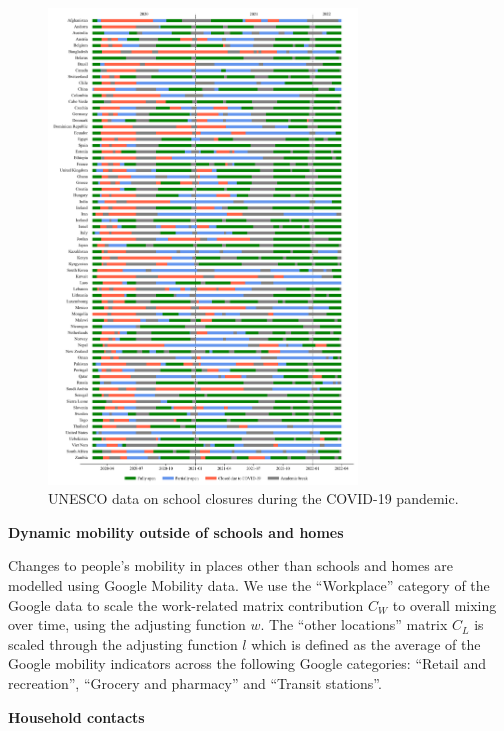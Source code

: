 \begin{figure}[p]
  \begin{center}
  \includegraphics[width=0.73\textwidth]{../../tex_descriptions/projects/sm_covid/school_closures/unesco.png}
  \end{center}
  \caption{UNESCO data on school closures during the COVID-19 pandemic.
  } 
  \label{fig:unesco}
\end{figure}

\vspace{5pt}
\textbf{Dynamic mobility outside of schools and homes}

Changes to people's mobility in places other than schools and homes are modelled using Google Mobility data. We use the ``Workplace''
category of the Google data to scale the work-related matrix contribution $C_W$ to overall mixing over time, using the adjusting function
$w$. The ``other locations'' matrix $C_L$ is scaled through the adjusting function $l$ which is defined as the average of the Google mobility
indicators across the following Google categories: ``Retail and recreation'', ``Grocery and pharmacy'' and ``Transit stations''.

\vspace{5pt}
\textbf{Household contacts}

